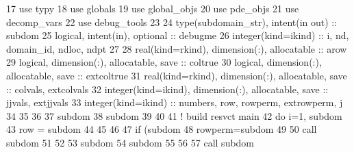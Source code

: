 \begin{DoxyCode}
17       \textcolor{keywordtype}{use }typy 
18       \textcolor{keywordtype}{use }globals
19       \textcolor{keywordtype}{use }global_objs
20       \textcolor{keywordtype}{use }pde_objs
21       \textcolor{keywordtype}{use }decomp_vars
22       \textcolor{keywordtype}{use }debug_tools
23       
24       \textcolor{keywordtype}{type}(subdomain_str), \textcolor{keywordtype}{intent(in out)} :: subdom
25       \textcolor{keywordtype}{logical}, \textcolor{keywordtype}{intent(in)}, \textcolor{keywordtype}{optional} :: debugme
26       \textcolor{keywordtype}{integer(kind=ikind)} :: i, nd, domain\_id, ndloc, ndpt
27             
28       \textcolor{keywordtype}{real(kind=rkind)}, \textcolor{keywordtype}{dimension(:)}, \textcolor{keywordtype}{allocatable} :: arow
29       \textcolor{keywordtype}{logical}, \textcolor{keywordtype}{dimension(:)}, \textcolor{keywordtype}{allocatable}, \textcolor{keywordtype}{save} :: coltrue
30       \textcolor{keywordtype}{logical}, \textcolor{keywordtype}{dimension(:)}, \textcolor{keywordtype}{allocatable}, \textcolor{keywordtype}{save} :: extcoltrue
31       \textcolor{keywordtype}{real(kind=rkind)}, \textcolor{keywordtype}{dimension(:)}, \textcolor{keywordtype}{allocatable}, \textcolor{keywordtype}{save} :: colvals, extcolvals
32       \textcolor{keywordtype}{integer(kind=ikind)}, \textcolor{keywordtype}{dimension(:)}, \textcolor{keywordtype}{allocatable}, \textcolor{keywordtype}{save} :: jjvals, extjjvals
33       \textcolor{keywordtype}{integer(kind=ikind)} :: numbers, row, rowperm, extrowperm, j
34       
35       
36       
37       subdom%
38       subdom%
39       
40 
41       \textcolor{comment}{! build resvct main}
42       \textcolor{keywordflow}{do} i=1, subdom%
43         row = subdom%
44         
45 
46         
47         \textcolor{keywordflow}{if} (subdom%
48           rowperm=subdom%
49           
50           \textcolor{keyword}{call }subdom%
51 \textcolor{comment}{      }
52 \textcolor{comment}{          }
53 \textcolor{comment}{          subdom%
54 \textcolor{comment}{            subdom%
55 \textcolor{comment}{            }
56 \textcolor{comment}{            }
57 \textcolor{comment}{          }\textcolor{keyword}{call }subdom%
}}
\end{DoxyCode}
